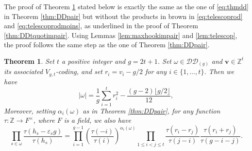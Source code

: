 \documentclass[11pt,letterpaper]{amsart}
\def\bbbz{\mathbb Z}
\def\cch{\mathcal H}
\def\ccdd{\mathcal {DD}}
\newtheorem{thm}[df]{Theorem}
\numberwithin{equation}{section}
\numberwithin{df}{section}
\begin{document}
The proof of Theorem \ref{thm:DDimpair} stated below is exactly the same as the one of \eqref{eq:thmdd} in Theorem \ref{thm:DDpair} but without the products in brown  in \eqref{eq:telescoprod} and \eqref{eq:telescoprodmoins}, as underlined in the proof of Theorem \ref{thm:DDtquotimpair}. Using Lemmas \ref{lem:maxhookimpair} and \ref{lem:telescop}, the proof follows the same step as the one of Theorem \ref{thm:DDpair}.




\begin{thm}\label{thm:DDimpair}
Set $t$ a positive integer and $g=2t+1$. Set $\omega\in \ccdd_{(g)}$ and $\mathbf{v}\in\bbbz^{t}$ its associated $V_{g,t}$-coding, and set $r_i=v_i-g/2$ for any $i\in\lbrace1,\dots,t\rbrace$. Then we have
$$\lvert \omega\rvert = \frac{1}{g}\sum_{i=1}^{t} r_i^2-\frac{(g-2)\lfloor g/2\rfloor}{12},$$
Moreover, setting $\alpha_i(\omega)$ as in Theorem \ref{thm:DDpair}, for any function $\tau:\bbbz\rightarrow F^{\times}$, where $F$ is a field, we also have
\begin{equation}\label{eq:thmddimpair}
\prod_{s\in\omega}\frac{\tau(h_s-\varepsilon_s g)}{\tau(h_s)}=\prod_{i=1}^{g-1}\left(\frac{\tau(-i)}{\tau(i)}\right)^{\alpha_i(\omega)}
\prod_{1\leq i<j\leq t} \frac{\tau(r_i-r_j)}{\tau(j-i)} \frac{\tau(r_i+r_j)}{\tau(g-i-j)}.
\end{equation}

\end{thm}
\end{document}
